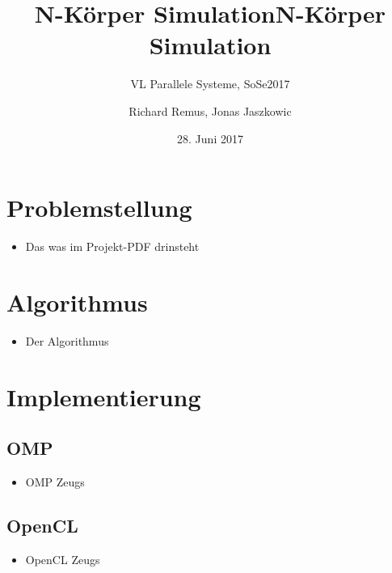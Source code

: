 \documentclass{beamer}
\begin{document}
\title{N-Körper Simulation}
\subtitle{VL Parallele Systeme, SoSe2017}
\author{Richard Remus, Jonas Jaszkowic}
\date{28. Juni 2017}

\begin{frame}
\title{N-Körper Simulation}
\titlepage
\end{frame}

\section{Problemstellung}
\begin{frame}
\begin{itemize}
  \item Das was im Projekt-PDF drinsteht
\end{itemize}
\end{frame}

\section{Algorithmus}
\begin{frame}
\begin{itemize}
  \item Der Algorithmus 
\end{itemize}
\end{frame}

\section{Implementierung}

\subsection{OMP}
\begin{frame}
\begin{itemize}
  \item OMP Zeugs
\end{itemize}
\end{frame}

\subsection{OpenCL}
\begin{frame}
\begin{itemize}
  \item OpenCL Zeugs
\end{itemize}
\end{frame}
\end{document}

